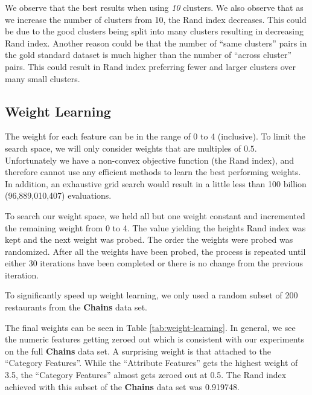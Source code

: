 \documentclass{article}
\begin{document}
         We observe that the best results when using \textit{10} clusters.
         We also observe that as we increase the number of clusters from 10, the Rand index decreases.
         This could be due to the good clusters being split into many clusters resulting in decreasing Rand index.
         Another reason could be that the number of ``same clusters'' pairs in the gold standard dataset is much higher than the number of ``across cluster'' pairs.
         This could result in Rand index preferring fewer and larger clusters over many small clusters.

   \subsection{Weight Learning}
      The weight for each feature can be in the range of 0 to 4 (inclusive).
      To limit the search space, we will only consider weights that are multiples of $0.5$.
      Unfortunately we have a non-convex objective function (the Rand index), and therefore cannot use any efficient methods to learn the best performing weights.
      In addition, an exhaustive grid search would result in a little less than 100 billion (96,889,010,407) evaluations.

      To search our weight space, we held all but one weight constant and incremented the remaining weight from 0 to 4.
      The value yielding the heights Rand index was kept and the next weight was probed.
      The order the weights were probed was randomized.
      After all the weights have been probed, the process is repeated until either 30 iterations have been completed or there is no change from the previous iteration.

      To significantly speed up weight learning, we only used a random subset of 200 restaurants from the \textbf{Chains} data set.

      The final weights can be seen in Table \ref{tab:weight-learning}.
      In general, we see the numeric features getting zeroed out which is consistent with our experiments on the full \textbf{Chains} data set.
      A surprising weight is that attached to the ``Category Features''.
      While the ``Attribute Features'' gets the highest weight of 3.5, the ``Category Features'' almost gets zeroed out at 0.5.
      The Rand index achieved with this subset of the \textbf{Chains} data set was 0.919748.
\end{document}

